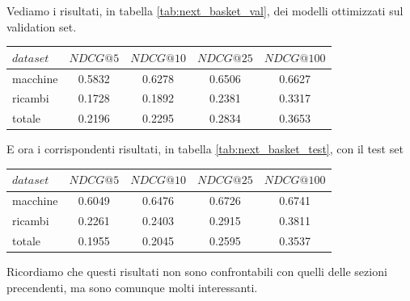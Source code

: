 Vediamo i risultati, in tabella \ref{tab:next_basket_val}, dei modelli ottimizzati sul validation set.
\begin{center}
    \begin{tabular}{|l|cccc|}
        \toprule
        $dataset$  &  $NDCG@5$ & $NDCG@10$  & $NDCG@25$ & $NDCG@100$  \\
        \midrule
        macchine & 0.5832 & 0.6278 & 0.6506 & 0.6627 \\
        ricambi & 0.1728 & 0.1892 & 0.2381 & 0.3317 \\
        totale  & 0.2196 & 0.2295 & 0.2834 & 0.3653 \\
    \bottomrule
    \end{tabular}
    \label{tab:next_basket_val}
\end{center}
E ora i corrispondenti risultati, in tabella \ref{tab:next_basket_test}, con il test set
\begin{center}
\begin{tabular}{|l|cccc|}
    \toprule
    $dataset$  &  $NDCG@5$ & $NDCG@10$  & $NDCG@25$ & $NDCG@100$  \\
    \midrule
    macchine & 0.6049 & 0.6476 & 0.6726 & 0.6741 \\
    ricambi & 0.2261 & 0.2403 & 0.2915 & 0.3811 \\
    totale  & 0.1955 & 0.2045 & 0.2595 & 0.3537 \\
\bottomrule
\end{tabular}
\label{tab:next_basket_test}
\end{center}
Ricordiamo che questi risultati non sono confrontabili con quelli delle sezioni precendenti, ma sono comunque molti interessanti.
